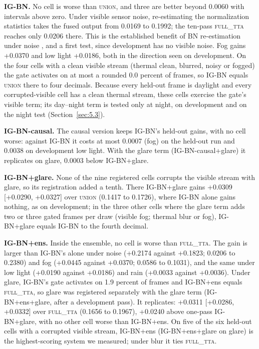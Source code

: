 \documentclass[journal]{IEEEtran}
\begin{document}
\textbf{IG-BN.} No cell is worse than \textsc{union}, and three are better beyond 0.0060 with intervals above zero. Under visible sensor noise, re-estimating the normalization statistics takes the fused output from 0.0169 to 0.1992; the ten-pass \textsc{full\_tta} reaches only 0.0206 there. This is the established benefit of BN re-estimation under noise \cite{schneider2020improving}, and a first test, since development has no visible noise. Fog gains +0.0370 and low light +0.0186, both in the direction seen on development. On the four cells with a clean visible stream (thermal clean, blurred, noisy or fogged) the gate activates on at most a rounded 0.0 percent of frames, so \mbox{IG-BN} equals \textsc{union} there to four decimals. Because every held-out frame is daylight and every corrupted-visible cell has a clean thermal stream, these cells exercise the gate's visible term; its day--night term is tested only at night, on development and on the night test (Section~\ref{sec:5.3}).

\textbf{IG-BN-causal.} The causal version keeps \mbox{IG-BN}'s held-out gains, with no cell worse: against \mbox{IG-BN} it costs at most 0.0007 (fog) on the held-out run and 0.0038 on development low light. With the glare term (\mbox{IG-BN-causal+glare}) it replicates on glare, 0.0003 below \mbox{IG-BN+glare}.

\textbf{IG-BN+glare.} None of the nine registered cells corrupts the visible stream with glare, so its registration added a tenth. There \mbox{IG-BN+glare} gains +0.0309 [+0.0290, +0.0327] over \textsc{union} (0.1417 to 0.1726), where \mbox{IG-BN} alone gains nothing, as on development; in the three other cells where the glare term adds two or three gated frames per draw (visible fog; thermal blur or fog), \mbox{IG-BN+glare} equals \mbox{IG-BN} to the fourth decimal.

\textbf{IG-BN+ens.} Inside the ensemble, no cell is worse than \textsc{full\_tta}. The gain is larger than \mbox{IG-BN}'s alone under noise (+0.2174 against +0.1823; 0.0206 to 0.2380) and fog (+0.0445 against +0.0370; 0.0586 to 0.1031), and the same under low light (+0.0190 against +0.0186) and rain (+0.0033 against +0.0036). Under glare, \mbox{IG-BN}'s gate activates on 1.9 percent of frames and \mbox{IG-BN+ens} equals \textsc{full\_tta}, so glare was registered separately with the glare term (\mbox{IG-BN+ens+glare}, after a development pass). It replicates: +0.0311 [+0.0286, +0.0332] over \textsc{full\_tta} (0.1656 to 0.1967), +0.0240 above one-pass \mbox{IG-BN+glare}, with no other cell worse than \mbox{IG-BN+ens}. On five of the six held-out cells with a corrupted visible stream, \mbox{IG-BN+ens} (\mbox{IG-BN+ens+glare} on glare) is the highest-scoring system we measured; under blur it ties \textsc{full\_tta}.
\end{document}
